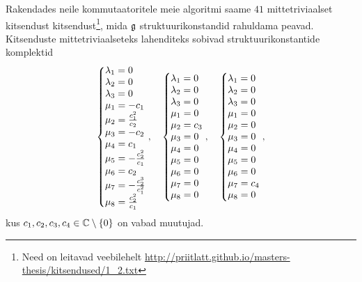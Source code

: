 Rakendades neile kommutaatoritele meie algoritmi saame $41$
mittetriviaalset kitsendust kitsendust\footnote{Need on leitavad veebilehelt
\url{http://priitlatt.github.io/masters-thesis/kitsendused/1_2.txt}},
mida $\mathfrak{g}$ struktuurikonstandid rahuldama peavad. Kitsenduste
mittetriviaalseteks lahenditeks sobivad struktuurikonstantide komplektid
\renewcommand\arraystretch{1.3}
\begin{align*}
    \left\{ \begin{matrix*}[l]
        \l_1 = 0 \\
        \l_2 = 0 \\
        \l_3 = 0 \\
        \m_1 = -c_1 \\
        \m_2 = \frac{c_1^2}{c_2} \\
        \m_3 = -c_2 \\
        \m_4 = c_1 \\
        \m_5 = -\frac{c_2^2}{c_1} \\
        \m_6 = c_2 \\
        \m_7 = -\frac{c_2^3}{c_1^2} \\
        \m_8 = \frac{c_2^2}{c_1} \\
    \end{matrix*} \right.,
    \quad
    \left\{ \begin{matrix*}[l]
        \l_1 = 0 \\
        \l_2 = 0 \\
        \l_3 = 0 \\
        \m_1 = 0 \\
        \m_2 = c_3 \\
        \m_3 = 0 \\
        \m_4 = 0 \\
        \m_5 = 0 \\
        \m_6 = 0 \\
        \m_7 = 0 \\
        \m_8 = 0 \\
    \end{matrix*} \right.,
    \quad
    \left\{ \begin{matrix*}[l]
        \l_1 = 0 \\
        \l_2 = 0 \\
        \l_3 = 0 \\
        \m_1 = 0 \\
        \m_2 = 0 \\
        \m_3 = 0 \\
        \m_4 = 0 \\
        \m_5 = 0 \\
        \m_6 = 0 \\
        \m_7 = c_4 \\
        \m_8 = 0 \\
    \end{matrix*} \right.,
\end{align*}
\renewcommand\arraystretch{1}
kus $c_1, c_2, c_3, c_4 \in \mathbb{C} \setminus \{0\}$ on vabad muutujad.

